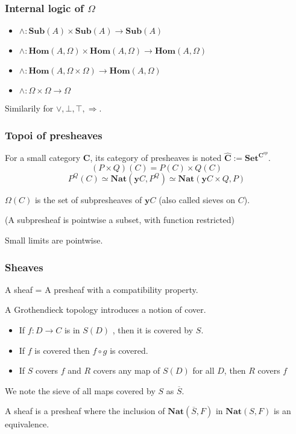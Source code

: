 \documentclass{beamer}
\newcommand{\ovl}{\overline}
\newcommand{\0}{\boldsymbol{0}}
\newcommand{\1}{\boldsymbol{1}}
\begin{document}
\begin{frame}
    \frametitle{Internal logic of $\Omega$}

    \begin{itemize}
        \item $\land : \mathbf{Sub}(A)\times \mathbf{Sub}(A) \to \mathbf{Sub}(A)$
        \item $\land : \mathbf{Hom}(A,\Omega)\times \mathbf{Hom}(A,\Omega)\to \mathbf{Hom}(A,\Omega)$
        \item $\land : \mathbf{Hom}(A,\Omega\times \Omega)\to\mathbf{Hom}(A,\Omega)$
        \item $\land : \Omega\times\Omega \to\Omega$
    \end{itemize}

    Similarily for $\lor,\bot,\top,\Rightarrow$.
\end{frame}

\begin{frame}
    \frametitle{Topoi of presheaves}
    For a small category $\textbf{C}$, its category of presheaves is noted $\widehat{\textbf{C}} := \mathbf{Set}^{\textbf{C}^{op}}$.
    $$ (P\times Q) (C) = P(C)\times Q(C)$$
    $$P^Q(C) \simeq \mathbf{Nat}(\mathbf{y}C,P^Q)\simeq \mathbf{Nat}(\mathbf{y}C \times Q, P)$$
    \vspace{0cm}

    \centering $\Omega(C)$ is the set of subpresheaves of $\mathbf{y}C$ (also called sieves on $C$).

    \centering (A subpresheaf is pointwise a subset, with function restricted)

    \vspace{0.5cm}
    Small limits are pointwise.
\end{frame}

\begin{frame}
    \frametitle{Sheaves}

    A sheaf = A presheaf with a compatibility property.
    \vspace{0.5cm}

    A Grothendieck topology introduces a notion of cover.

\begin{itemize}
    \item If $f : D\to C$ is in $S(D)$ , then it is covered by $S$.
    \item If $f$ is covered then $f \circ g$ is covered.
    \item If $S$ covers $f$ and $R$ covers any map of $S(D)$ for all $D$, then $R$ covers $f$
\end{itemize}

We note the sieve of all maps covered by $S$ as $\ovl{S}$.

    \vspace{0.5cm}

    A sheaf is a presheaf where the inclusion of $\mathbf{Nat}(\ovl{S},F)$ in $\mathbf{Nat}(S, F)$ is an equivalence.
\end{frame}
\end{document}
